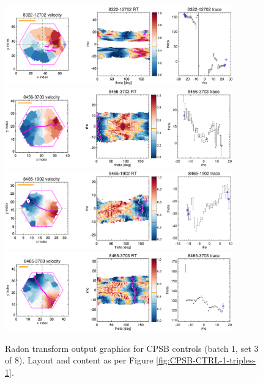 \documentclass[fleqn,usenatbib]{mnras}
\begin{document}
\begin{figure}
    \centering
    \includegraphics[width=0.88\textwidth]{Images/SN1-MC250/CPSB-CTRL-1-triples/8322-12702-1-250-10.png}
    \includegraphics[width=0.88\textwidth]{Images/SN1-MC250/CPSB-CTRL-1-triples/8456-3703-1-250-10.png}
    \includegraphics[width=0.88\textwidth]{Images/SN1-MC250/CPSB-CTRL-1-triples/8465-1902-1-250-10.png}
    \includegraphics[width=0.88\textwidth]{Images/SN1-MC250/CPSB-CTRL-1-triples/8465-3703-1-250-10.png}    
    \caption{Radon transform output graphics for CPSB controls (batch 1, set 3 of 8). Layout and content as per Figure \ref{fig:CPSB-CTRL-1-triples-1}.}
    \label{fig:CPSB-CTRL-1-triples-3}
\end{figure}
\end{document}
